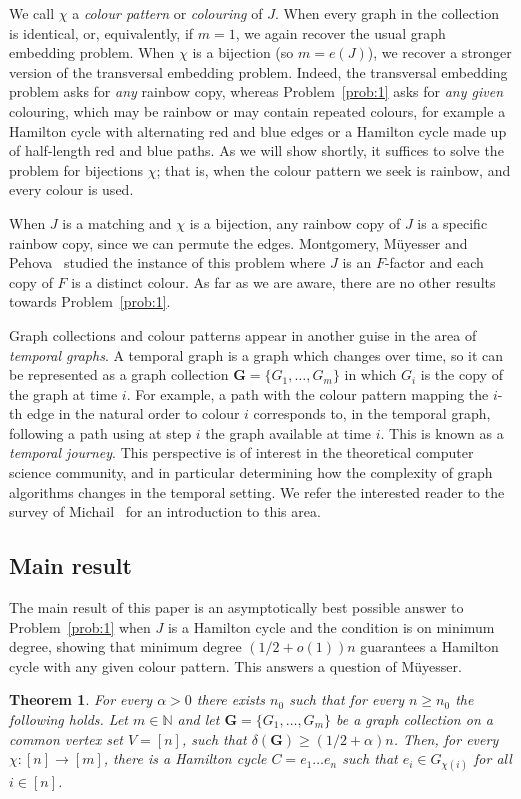 \documentclass[11pt, dvipsnames]{amsart}
\theoremstyle{plain}
\newtheorem{theo}{Theorem}[section]
\theoremstyle{definition}
\newcommand{\mbf}[1]{\mathbf{#1}}
\begin{document}
We call $\chi$ a \emph{colour pattern} or \emph{colouring} of $J$. When every graph in the collection is identical, or, equivalently, if $m=1$, we again recover the usual graph embedding problem. When $\chi$ is a bijection (so $m=e(J)$), we recover a stronger version of the transversal embedding problem.
Indeed, the transversal embedding problem asks for \emph{any} rainbow copy, whereas Problem~\ref{prob:1} asks for \emph{any given} colouring, which may be rainbow or may contain repeated colours, for example a Hamilton cycle with alternating red and blue edges or a Hamilton cycle made up of half-length red and blue paths. As we will show shortly, it suffices to solve the problem  for bijections $\chi$; that is, when the colour pattern we seek is rainbow, and every colour is used.

When $J$ is a matching and $\chi$ is a bijection, any rainbow copy of $J$ is a specific rainbow copy, since we can permute the edges.
Montgomery, M\"uyesser and Pehova~\cite{mmp} studied the instance of this problem where $J$ is an $F$-factor and each copy of $F$ is a distinct colour.
As far as we are aware, there are no other results towards Problem~\ref{prob:1}.

Graph collections and colour patterns appear in another guise in the area of \emph{temporal graphs}. A temporal graph is a graph which changes over time, so it can be represented as a graph collection $\mathbf{G}=\{G_1,\ldots,G_m\}$ in which $G_i$ is the copy of the graph at time $i$.
For example, a path with the colour pattern mapping the $i$-th edge in the natural order to colour $i$ corresponds to, in the temporal graph, following a path using at step $i$ the graph available at time $i$. This is known as a \emph{temporal journey}.
This perspective is of interest in the theoretical computer science community, and in particular determining how the complexity of graph algorithms changes in the temporal setting. We refer the interested reader to the survey of Michail~\cite{michail} for an introduction to this area.

\subsection{Main result}

The main result of this paper is an asymptotically best possible answer to Problem~\ref{prob:1} when $J$ is a Hamilton cycle and the condition is on minimum degree, showing that minimum degree $(1/2+o(1))n$ guarantees a Hamilton cycle with any given colour pattern. This answers a question of M\"{u}yesser.
\begin{theo}\label{thm:general} For every $\alpha>0$ there exists $n_0$ such that for every $n \geq n_0$ the following holds.
Let $m \in \mathbb{N}$ and let $\mbf{G}=\{G_1, \ldots, G_m\}$ be a graph collection on a common vertex set $V=[n]$, such that $\delta(\mathbf{G})\geq (1/2+\alpha)n$. Then, for every $\chi:[n] \to [m]$, there is a Hamilton cycle $C=e_1\ldots e_n$ such that $e_i \in G_{\chi(i)}$ for all $i \in [n]$.
\end{theo}
\end{document}
